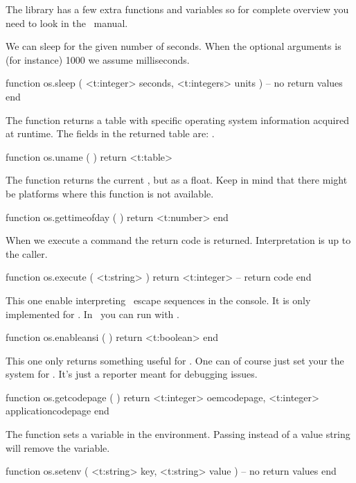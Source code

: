\startsubsection[title=Extra operating system helpers]

The  library has a few extra functions and variables so for complete
overview you need to look in the \LUA\ manual.

We can sleep for the given number of seconds. When the optional 
arguments is (for instance) 1000 we assume milliseconds.

\starttyping[option=LUA]
function os.sleep (
    <t:integer>  seconds,
    <t:integers> units
)
    -- no return values
end
\stoptyping

The  function returns a table with specific operating system
information acquired at runtime. The fields in the returned table are:
.

\starttyping[option=LUA]
function os.uname ( )
    return <t:table>
\stoptyping

The  function returns the current ,
but as a float. Keep in mind that there might be platforms where this function is
not available.

\starttyping[option=LUA]
function os.gettimeofday ( )
    return <t:number>
end
\stoptyping

When we execute a command the return code is returned. Interpretation is up to
the caller.

\starttyping[option=LUA]
function os.execute ( <t:string> )
    return <t:integer> -- return code
end
\stoptyping

This one enable interpreting \ANSI\ escape sequences in the console. It is only
implemented for \MSWINDOWS. In \CONTEXT\ you can run with .

\starttyping[option=LUA]
function os.enableansi ( )
    return <t:boolean>
end
\stoptyping

This one only returns something useful for \MSWINDOWS. One can of course just set
your the system for . It's just a reporter meant for debugging issues.

\starttyping[option=LUA]
function os.getcodepage ( )
    return
        <t:integer> oemcodepage,
        <t:integer> applicationcodepage
end
\stoptyping

The  function sets a variable in the environment. Passing
 instead of a value string will remove the variable.

\starttyping[option=LUA]
function os.setenv (
    <t:string> key,
    <t:string> value
)
    -- no return values
end
\stoptyping

